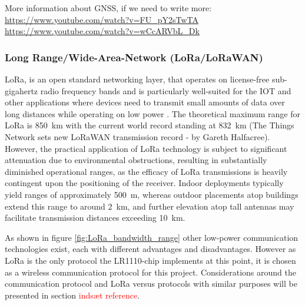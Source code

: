 More information about \ac{GNSS}, if we need to write more:
\url{https://www.youtube.com/watch?v=FU_pY2sTwTA}
\url{https://www.youtube.com/watch?v=wCcARVbL_Dk}


\subsubsection{Long Range/Wide-Area-Network (LoRa/LoRaWAN)}
\ac{LoRa}, is an open standard networking layer, that operates on license-free sub-gigahertz radio frequency bands and is particularly well-suited for the \ac{IOT} and other applications where devices need to transmit small amounts of data over long distances while operating on low power \cite{LoRaWAN_1_0}.
The theoretical maximum range for LoRa is \SI{850}{\kilo\meter} with the current world record standing at \SI{832}{\kilo\meter} (The Things Network sets new \ac{LoRaWAN} transmission record - by Gareth Halfacree).
However, the practical application of \ac{LoRa} technology is subject to significant attenuation due to environmental obstructions, resulting in substantially diminished operational ranges, as the efficacy of \ac{LoRa} transmissions is heavily contingent upon the positioning of the receiver. Indoor deployments typically yield ranges of approximately \SI{500}{\meter}, whereas outdoor placements atop buildings extend this range to around \SI{2}{\kilo\meter}, and further elevation atop tall antennas may facilitate transmission distances exceeding \SI{10}{\kilo\meter}.

As shown in figure \ref{fig:LoRa_bandwidth_range} other low-power communication technologies exist, each with different advantages and disadvantages. However as \ac{LoRa} is the only protocol the LR1110-chip implements at this point, it is chosen as a wireless communication protocol for this project.
Considerations around the communication protocol and \ac{LoRa} versus protocols with similar purposes will be presented in section \textcolor{red}{indsæt reference}.

